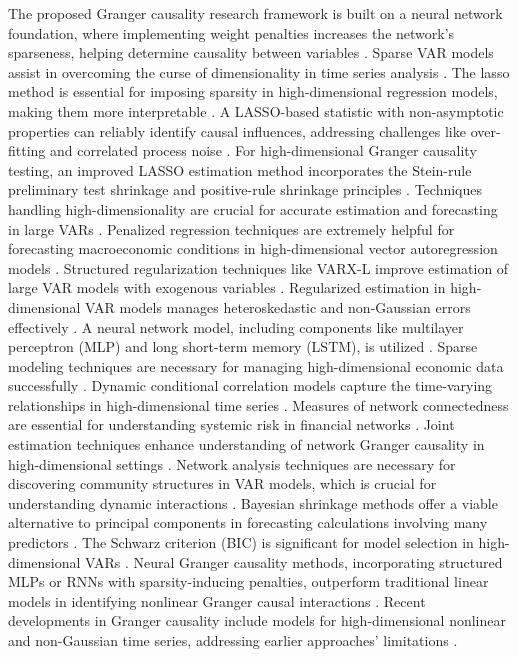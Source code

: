 \documentclass[11pt]{article}
\begin{document}
The proposed Granger causality research framework is built on a neural network foundation, where implementing weight penalties increases the network's sparseness, helping determine causality between variables \cite{Richard2016Sparse}. Sparse VAR models assist in overcoming the curse of dimensionality in time series analysis \cite{Richard2016Sparse}. The lasso method is essential for imposing sparsity in high-dimensional regression models, making them more interpretable \cite{rt1996Regression}. A LASSO-based statistic with non-asymptotic properties can reliably identify causal influences, addressing challenges like over-fitting and correlated process noise \cite{Behtash2023Non}. For high-dimensional Granger causality testing, an improved LASSO estimation method incorporates the Stein-rule preliminary test shrinkage and positive-rule shrinkage principles \cite{undefined2015Improved} \cite{Stephan2023Lasso}. Techniques handling high-dimensionality are crucial for accurate estimation and forecasting in large VARs \cite{Peter2011Large}. Penalized regression techniques are extremely helpful for forecasting macroeconomic conditions in high-dimensional vector autoregression models \cite{Etienne2018Macroeconomic}. Structured regularization techniques like VARX-L improve estimation of large VAR models with exogenous variables \cite{William2017VARX}. Regularized estimation in high-dimensional VAR models manages heteroskedastic and non-Gaussian errors effectively \cite{Marcelo2016l1}. A neural network model, including components like multilayer perceptron (MLP) and long short-term memory (LSTM), is utilized \cite{Graves2012Sequence}. Sparse modeling techniques are necessary for managing high-dimensional economic data successfully \cite{Jinchi2011Sparse}. Dynamic conditional correlation models capture the time-varying relationships in high-dimensional time series \cite{Engle2002Dynamic}. Measures of network connectedness are essential for understanding systemic risk in financial networks \cite{Francis2018Estimating}\cite{Pedro2016Inferring}. Joint estimation techniques enhance understanding of network Granger causality in high-dimensional settings \cite{G2019Joint}. Network analysis techniques are necessary for discovering community structures in VAR models, which is crucial for understanding dynamic interactions \cite{Mark2004Finding} \cite{Luca2023Granger} \cite{Torben2000Exchange}. Bayesian shrinkage methods offer a viable alternative to principal components in forecasting calculations involving many predictors \cite{De2008Forecasting}. The Schwarz criterion (BIC) is significant for model selection in high-dimensional VARs \cite{Schwarz1978Estimating}. Neural Granger causality methods, incorporating structured MLPs or RNNs with sparsity-inducing penalties, outperform traditional linear models in identifying nonlinear Granger causal interactions \cite{Ian2021Neural}. Recent developments in Granger causality include models for high-dimensional nonlinear and non-Gaussian time series, addressing earlier approaches' limitations \cite{Emily2022Granger} \cite{oNaNForecasting}.
\end{document}
